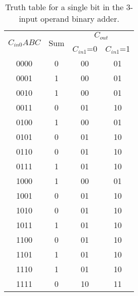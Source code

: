 \documentclass{article}
\begin{document}
\begin{table}[h!]
\begin{center}
\begin{tabular}{||c|c|c|c||} 
 \hline
 \multirow{2}{*}{$C_{in0}ABC$} & \multirow{2}{*}{Sum} & \multicolumn{2}{c||}{$C_{out}$} \\
 \cline{3-4}
  & & $C_{in1}$=0 & $C_{in1}$=1 \\ [0.5ex]
 \hline\hline
 0000   & 0   & 00 & 01    \\
 0001   & 1   & 00 & 01    \\
 0010   & 1   & 00 & 01    \\
 0011   & 0   & 01 & 10    \\
 0100   & 1   & 00 & 01    \\
 0101   & 0   & 01 & 10    \\
 0110   & 0   & 01 & 10    \\
 0111   & 1   & 01 & 10    \\
 1000   & 1   & 00 & 01    \\
 1001   & 0   & 01 & 10    \\
 1010   & 0   & 01 & 10    \\
 1011   & 1   & 01 & 10    \\
 1100   & 0   & 01 & 10    \\
 1101   & 1   & 01 & 10    \\
 1110   & 1   & 01 & 10    \\
 1111   & 0   & 10 & 11    \\
 \hline
\end{tabular}
\end{center}
\caption{Truth table for a single bit in the 3-input operand binary adder.}
\end{table}
\end{document}

